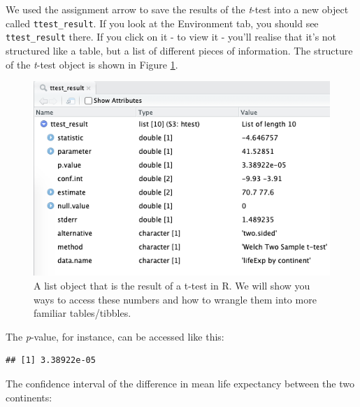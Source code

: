 \documentclass[
  12pt,
  krantz2]{krantz}
\makeatletter
\newenvironment{Shaded}{\begin{snugshade}}{\end{snugshade}}
\newcommand{\CommentTok}[1]{\textcolor[rgb]{0.56,0.35,0.01}{\textit{#1}}}
\newcommand{\NormalTok}[1]{#1}
\newcommand{\OperatorTok}[1]{\textcolor[rgb]{0.81,0.36,0.00}{\textbf{#1}}}
\newenvironment{kframe}{%
\medskip{}
\setlength{\fboxsep}{.8em}
 \def\at@end@of@kframe{}%
 \ifinner\ifhmode%
  \def\at@end@of@kframe{\end{minipage}}%
  \begin{minipage}{\columnwidth}%
 \fi\fi%
 \def\FrameCommand##1{\hskip\@totalleftmargin \hskip-\fboxsep
 \colorbox{shadecolor}{##1}\hskip-\fboxsep
     \hskip-\linewidth \hskip-\@totalleftmargin \hskip\columnwidth}%
 \MakeFramed {\advance\hsize-\width
   \@totalleftmargin\z@ \linewidth\hsize
   \@setminipage}}%
 {\par\unskip\endMakeFramed%
 \at@end@of@kframe}
\renewenvironment{Shaded}{\begin{kframe}}{\end{kframe}}
\makeatother
\begin{document}
We used the assignment arrow to save the results of the \emph{t}-test into a new object called \texttt{ttest\_result}.
If you look at the Environment tab, you should see \texttt{ttest\_result} there.
If you click on it - to view it - you'll realise that it's not structured like a table, but a list of different pieces of information.
The structure of the \emph{t}-test object is shown in Figure \ref{fig:chap06-ttest-object}.

\begin{figure}
\includegraphics[width=1\linewidth]{images/chapter06/ttest-object} \caption{A list object that is the result of a t-test in R. We will show you ways to access these numbers and how to wrangle them into more familiar tables/tibbles.}\label{fig:chap06-ttest-object}
\end{figure}

The \emph{p}-value, for instance, can be accessed like this:

\begin{Shaded}
\end{Shaded}

\begin{verbatim}
## [1] 3.38922e-05
\end{verbatim}

The confidence interval of the difference in mean life expectancy between the two continents:

\begin{Shaded}
\end{Shaded}
\end{document}
